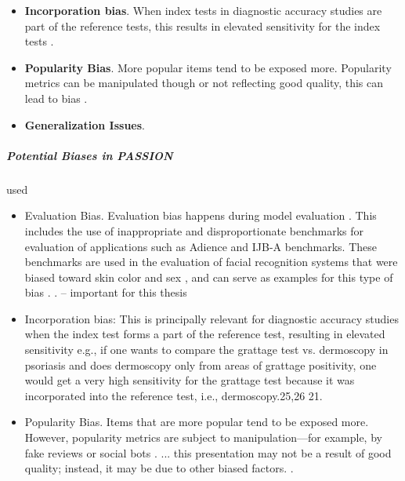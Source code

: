 \begin{refsection}
\begin{itemize}
			\item  \textbf{Incorporation bias}. When index tests in diagnostic accuracy studies are part of the reference tests, this results in elevated sensitivity for the index tests \autocites{Chakraborty_2024, c21, c25, c26}{Young_2020}.
			
			\item \textbf{Popularity Bias}. More popular items tend to be exposed more. Popularity metrics can be manipulated though or not reflecting good quality, this can lead to bias \autocites{M117_Ciampaglia_2018}{Mehrabi_2021}.
			
			\item \textbf{Generalization Issues}.  \autocite{} 
		\end{itemize}
		
		
		\subparagraph{Potential Biases in PASSION}
		
		\rawcitationstart
		used
		\begin{itemize}		
			\rawcitationusedstart
			\item Evaluation Bias. Evaluation bias happens during model evaluation \autocite{M144_Suresh_2021}. This includes the use of inappropriate and disproportionate benchmarks for evaluation of applications such as Adience and IJB-A benchmarks. These benchmarks are used in the evaluation of facial recognition systems that were biased toward skin color and sex \autocite{M24_Buolamwini_2018}, and can serve as examples for this type of bias \autocite{M144_Suresh_2021}. \autocite{Mehrabi_2021}. -- important for this thesis
			
			\item  Incorporation bias: This is principally relevant for diagnostic accuracy studies when the index test forms a part of the reference test, resulting in elevated sensitivity e.g., if one wants to compare the grattage test vs. dermoscopy in psoriasis and does dermoscopy only from areas of grattage positivity, one would get a very high sensitivity for the grattage test because it was incorporated into the reference test, i.e., dermoscopy.25,26 21.\autocite{Chakraborty_2024}
			
			\item Popularity Bias. Items that are more popular tend to be exposed more. However, popularity metrics are subject to manipulation—for example, by fake reviews or social bots \autocite{M117_Ciampaglia_2018}. ... this presentation may not be a result of good quality; instead, it may be due to other biased factors. \autocite{Mehrabi_2021}.
			\rawcitationusedend
		\end{itemize}
		\rawcitationend
		

\end{refsection}
